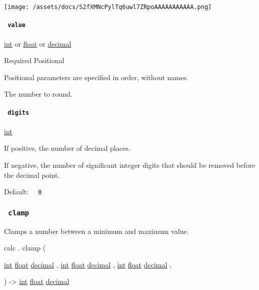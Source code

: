 \texttt{[image: /assets/docs/S2fXMNcPylTq6uwl7ZRpoAAAAAAAAAAA.png]}

\paragraph{\texorpdfstring{\texttt{\ value\ }}{ value }}\label{functions-round-value}

\href{/docs/reference/foundations/int/}{int} {or}
\href{/docs/reference/foundations/float/}{float} {or}
\href{/docs/reference/foundations/decimal/}{decimal}

{Required} {{ Positional }}

\label{functions-round-value-positional-tooltip}
Positional parameters are specified in order, without names.

The number to round.

\paragraph{\texorpdfstring{\texttt{\ digits\ }}{ digits }}\label{functions-round-digits}

\href{/docs/reference/foundations/int/}{int}

If positive, the number of decimal places.

If negative, the number of significant integer digits that should be
removed before the decimal point.

Default: \texttt{\ }{\texttt{\ 0\ }}\texttt{\ }

\subsubsection{\texorpdfstring{\texttt{\ clamp\ }}{ clamp }}\label{functions-clamp}

Clamps a number between a minimum and maximum value.

calc { . } { clamp } (

{ \href{/docs/reference/foundations/int/}{int}
\href{/docs/reference/foundations/float/}{float}
\href{/docs/reference/foundations/decimal/}{decimal} , } {
\href{/docs/reference/foundations/int/}{int}
\href{/docs/reference/foundations/float/}{float}
\href{/docs/reference/foundations/decimal/}{decimal} , } {
\href{/docs/reference/foundations/int/}{int}
\href{/docs/reference/foundations/float/}{float}
\href{/docs/reference/foundations/decimal/}{decimal} , }

) -\textgreater{} \href{/docs/reference/foundations/int/}{int}
\href{/docs/reference/foundations/float/}{float}
\href{/docs/reference/foundations/decimal/}{decimal}

